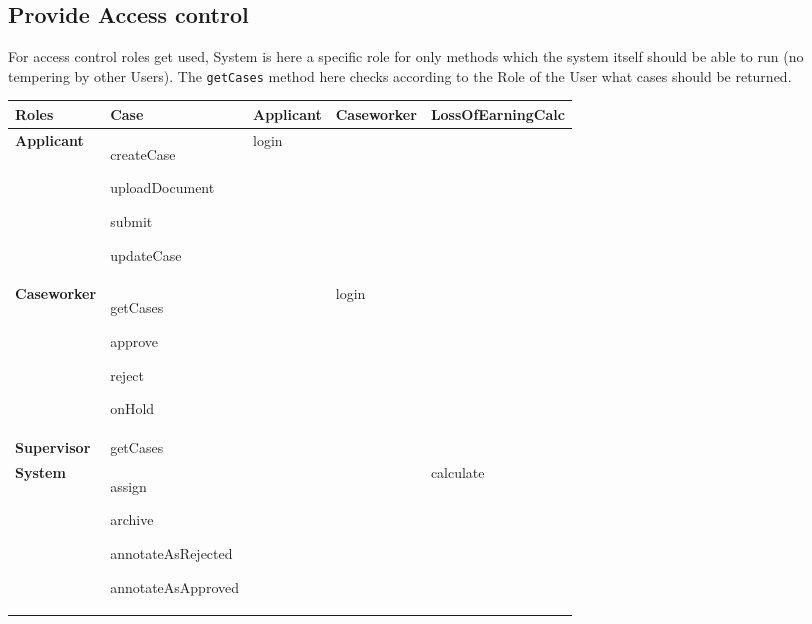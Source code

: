 \newpage
\subsection{Provide Access control}
For access control roles get used, System is here a specific role for only methods which the system itself should be able to run (no tempering by other Users).
The \texttt{getCases} method here checks according to the Role of the User what cases should be returned.

\begin{table}[htb!]
\begin{tabularx}{\textwidth}{l|X|l|l|l}
	\textbf{Roles} & \textbf{Case} & \textbf{Applicant} & \textbf{Caseworker} & \textbf{LossOfEarningCalc}\\
	\hline
	\textbf{Applicant} & 
	\begin{compactitem}
	    \item createCase
	    \item uploadDocument
	    \item submit
	    \item updateCase
	\end{compactitem}  &  login & & \\
	\hline
	\textbf{Caseworker} & 
	\begin{compactitem} 
	    \item getCases
	    \item approve
	    \item reject
	    \item onHold
	\end{compactitem} & & login & \\
	\hline
	\textbf{Supervisor} & getCases & & & \\
	\hline
	\textbf{System} & 
	\begin{compactitem}
	    \item assign
	    \item archive
	    \item annotateAsRejected
	    \item annotateAsApproved
	\end{compactitem} & & & calculate\\
\end{tabularx}
\end{table}